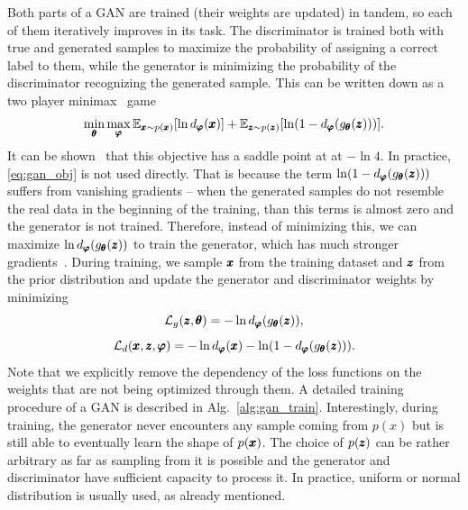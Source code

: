 Both parts of a GAN are trained (their weights are updated) in tandem, so each of them iteratively improves in its task. The discriminator is trained both with true and generated samples to maximize the probability of assigning a correct label to them, while the generator is minimizing the probability of the discriminator
recognizing the generated sample. This can be written down as a two player minimax~\cite{maschler2020game} game 
\begin{equation} \label{eq:gan_obj}
\min_{\vc{\theta}}\max_{\vc{\varphi}}\mathbb{E}_{ \vc{x} \sim p(\vc{x})}\left[\ln d_{\vc{\varphi}}(\vc{x})\right]+\mathbb{E}_{\vc{z}\sim p(\vc{z})}\left[\ln\left(1-d_{\vc{\varphi}}(g_{\vc{\theta}}(\vc{z}))\right)\right].
\end{equation}
It can be shown~\cite{goodfellow2014gan} that this objective has a saddle point at at $-\ln4$. In practice, \eqref{eq:gan_obj} is not used directly. That is because the term $\ln\left(1-d_{\vc{\varphi}}(g_{\vc{\theta}}(\vc{z}))\right)$ suffers from vanishing gradients -- when the generated samples do not resemble the real data in the beginning of the training, than this terms is almost zero and the generator is not trained. Therefore, instead of minimizing this, we can maximize $\ln d_{\pmb{{\varphi}}}(g_{\pmb{{\theta}}}(\pmb{{z}}))$ to train the generator, which has much stronger gradients~\cite{goodfellow2014gan}. During training, we sample $\pmb{{x}}$ from the training dataset and $\pmb{{z}}$ from the prior distribution and update the generator and discriminator weights by minimizing
\begin{equation}\label{eq:gen_loss}
\mathcal{L}_{g}(\pmb{{z}},\pmb{{\theta}})= - \ln d_{\pmb{{\varphi}}}(g_{\pmb{{\theta}}}(\pmb{{z}})),
\end{equation}
\begin{equation}\label{eq:disc_loss}
\mathcal{L}_{d}(\vc{x},\vc{z},\vc{\varphi})= - \ln d_{\vc{\varphi}}(\vc{x}) - \ln\left(1-d_{\vc{\varphi}}(g_{\vc{\theta}}(\vc{z}))\right).
\end{equation}
Note that we explicitly remove the dependency of the loss functions on the weights that are not being optimized through them. A detailed training procedure of a GAN is described in Alg.~\ref{alg:gan_train}. Interestingly, during training, the generator never encounters any sample coming from $p(x)$ but is still able to eventually learn the shape of $p(\pmb{{x}})$. The choice of $p(\pmb{{z}})$ can be rather arbitrary as far as sampling from it is possible and the generator and discriminator have sufficient capacity to process it. In practice, uniform or normal distribution is usually used, as already mentioned. 

